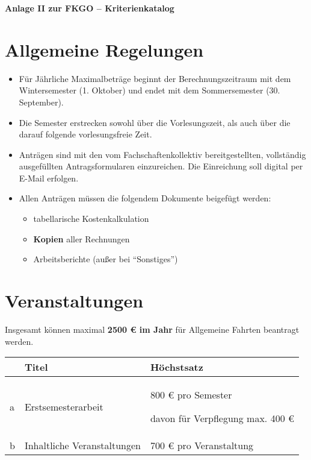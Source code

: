 \documentclass{article}
\begin{document}
\noindent
\begin{center}
    \huge \textbf{Anlage II zur FKGO -- Kriterienkatalog}
\end{center}

\section{Allgemeine Regelungen}
    \begin{itemize}
        \item Für Jährliche Maximalbeträge beginnt der Berechnungszeitraum mit dem Wintersemester (1. Oktober) und endet mit dem Sommersemester (30. September).
        \item Die Semester erstrecken sowohl über die Vorlesungszeit, als auch über die darauf folgende vorlesungsfreie Zeit.
        \item Anträgen sind mit den vom Fachschaftenkollektiv bereitgestellten, vollständig ausgefüllten Antragsformularen einzureichen. Die Einreichung soll digital per E-Mail erfolgen.
        \item Allen Anträgen müssen die folgendem Dokumente beigefügt werden:
        \begin{itemize}
            \item tabellarische Kostenkalkulation
            \item \textbf{Kopien} aller Rechnungen
            \item Arbeitsberichte (außer bei  "`Sonstiges"')
        \end{itemize}
    \end{itemize}

\section{Veranstaltungen}
    Insgesamt können maximal \textbf{2500 € im Jahr} für Allgemeine Fahrten beantragt werden. \\
    
    \setlength\extrarowheight{2mm} \sffamily    
    \begin{tabular}{l||L{6cm}|L{7cm}}

         &\textbf{Titel}  & \textbf{Höchstsatz} \\[1mm] \hline \hline
         a&
         Erstsemesterarbeit &
         800 € pro Semester\par
         davon für Verpflegung max. 400 € \\[1mm] \hline
          
        b&
        Inhaltliche Veranstaltungen & 
        700 € pro Veranstaltung \\[1mm]
        
    \end{tabular}
    \rmfamily
\end{document}
